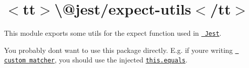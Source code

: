 \chapter{\texorpdfstring{$<$}{<}tt\texorpdfstring{$>$}{>}\textbackslash{}@jest/expect-\/utils\texorpdfstring{$<$}{<}/tt\texorpdfstring{$>$}{>}}
\hypertarget{md_node__modules_2_0djest_2expect-utils_2README}{}\label{md_node__modules_2_0djest_2expect-utils_2README}
\label{md_node__modules_2_0djest_2expect-utils_2README_autotoc_md1386}%
%
 This module exports some utils for the {\ttfamily expect} function used in \href{https://jestjs.io/}{\texttt{ Jest}}.

You probably don\textquotesingle{}t want to use this package directly. E.\+g. if you\textquotesingle{}re writing \href{https://jestjs.io/docs/expect\#expectextendmatchers}{\texttt{ custom matcher}}, you should use the injected \href{https://jestjs.io/docs/expect\#thisequalsa-b}{\texttt{ {\ttfamily this.\+equals}}}. 